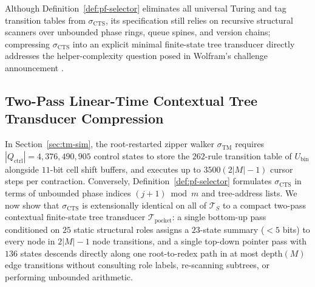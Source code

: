 \documentclass[11pt,reqno]{amsart}
\numberwithin{equation}{section}
\theoremstyle{plain}
\theoremstyle{definition}
\theoremstyle{remark}
\newcommand{\TS}{\mathcal{T}_S}
\begin{document}
Although Definition~\ref{def:pf-selector} eliminates all universal Turing and tag transition tables from $\sigma_{\mathrm{CTS}}$, its specification still relies on recursive structural scanners over unbounded phase rings, queue spines, and version chains; compressing $\sigma_{\mathrm{CTS}}$ into an explicit minimal finite-state tree transducer directly addresses the helper-complexity question posed in Wolfram's challenge announcement \cite{Wolfram2021Challenge}.

\subsection{Two-Pass Linear-Time Contextual Tree Transducer Compression}\label{subsec:pocket-transducer}

In Section~\ref{sec:tm-sim}, the root-restarted zipper walker $\sigma_{\mathrm{TM}}$ requires $|Q_{\mathrm{ctrl}}| = 4{,}376{,}490{,}905$ control states to store the $262$-rule transition table of $U_{\mathrm{bin}}$ alongside $11$-bit cell shift buffers, and executes up to $3500(2|M|-1)$ cursor steps per contraction. Conversely, Definition~\ref{def:pf-selector} formulates $\sigma_{\mathrm{CTS}}$ in terms of unbounded phase indices $(j + 1) \bmod m$ and tree-address lists. We now show that $\sigma_{\mathrm{CTS}}$ is extensionally identical on all of $\TS$ to a compact two-pass contextual finite-state tree transducer $\mathcal{T}_{\mathrm{pocket}}$: a single bottom-up pass conditioned on $25$ static structural roles assigns a $23$-state summary ($< 5$ bits) to every node in $2|M| - 1$ node transitions, and a single top-down pointer pass with $136$ states descends directly along one root-to-redex path in at most $\mathrm{depth}(M)$ edge transitions without consulting role labels, re-scanning subtrees, or performing unbounded arithmetic.
\end{document}
